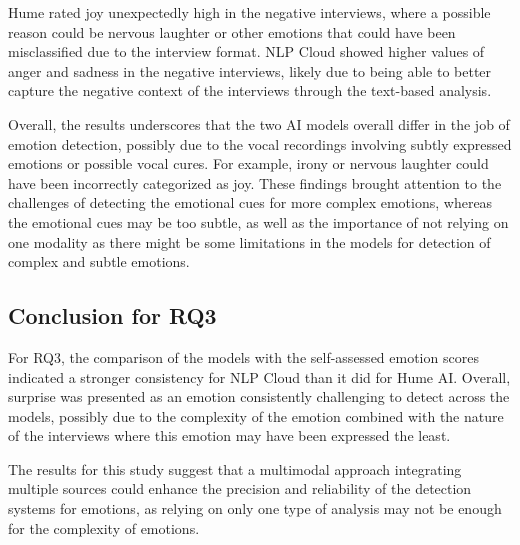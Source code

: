 Hume rated joy unexpectedly high in the negative interviews, where a possible reason could be nervous laughter or other emotions that could have been misclassified due to the interview format. NLP Cloud showed higher values of anger and sadness in the negative interviews, likely due to being able to better capture the negative context of the interviews through the text-based analysis.

Overall, the results underscores that the two AI models overall differ in the job of emotion detection, possibly due to the vocal recordings involving subtly expressed emotions or possible vocal cures. For example, irony or nervous laughter could have been incorrectly categorized as joy. These findings brought attention to the challenges of detecting the emotional cues for more complex emotions, whereas the emotional cues may be too subtle, as well as the importance of not relying on one modality as there might be some limitations in the models for detection of complex and subtle emotions.

\subsection{Conclusion for RQ3}
For RQ3, the comparison of the models with the self-assessed emotion scores indicated a stronger consistency for NLP Cloud than it did for Hume AI.
Overall, surprise was presented as an emotion consistently challenging to detect across the models, possibly due to the complexity of the emotion combined with the nature of the interviews where this emotion may have been expressed the least.

The results for this study suggest that a multimodal approach integrating multiple sources could enhance the precision and reliability of the detection systems for emotions, as relying on only one type of analysis may not be enough for the complexity of emotions.
